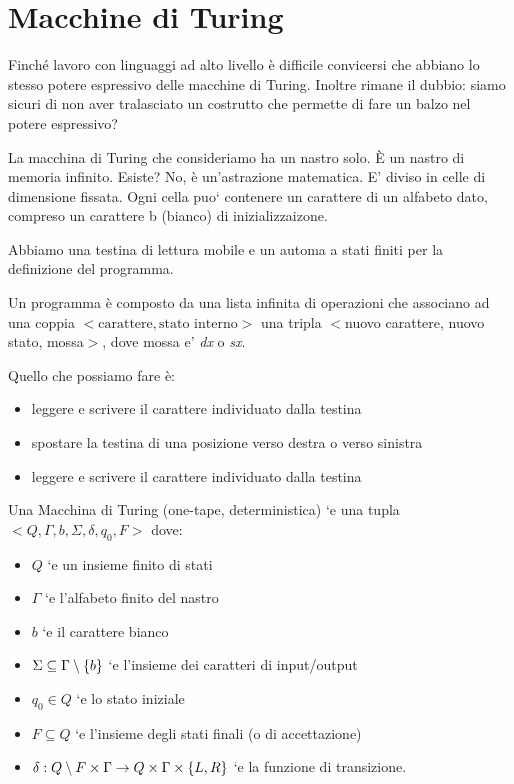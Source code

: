 \section{Macchine di Turing}

Finché lavoro con linguaggi ad alto livello è difficile convicersi che abbiano lo stesso potere
espressivo delle macchine di Turing. Inoltre rimane il dubbio: siamo sicuri di non aver tralasciato
un costrutto che permette di fare un balzo nel potere espressivo?

La macchina di Turing che consideriamo ha un nastro solo. È un nastro di memoria infinito. Esiste?
No, è un'astrazione matematica. E' diviso in celle di dimensione fissata. Ogni cella puo` contenere
un carattere di un alfabeto dato, compreso un carattere b (bianco) di inizializzaizone.

Abbiamo una testina di lettura mobile e un automa a stati finiti per la definizione del programma.

Un programma è composto da una lista infinita di operazioni che associano ad una coppia
$<\text{carattere},\text{stato interno}>$ una tripla $<$nuovo carattere, nuovo stato,
mossa$>$, dove mossa e' \textit{dx} o \textit{sx}.

Quello che possiamo fare è:
\begin{itemize}
    \item leggere e scrivere il carattere individuato dalla testina
    \item spostare la testina di una posizione verso destra o verso sinistra
    \item leggere e scrivere il carattere individuato dalla testina
\end{itemize}

Una Macchina di Turing (one-tape, deterministica) `e una tupla $<Q,\Gamma,b,\Sigma,\delta,q_{0},F>$
dove:
\begin{itemize}
    \item $Q$ `e un insieme finito di stati
    \item $\Gamma$ `e l'alfabeto finito del nastro
    \item $b$ `e il carattere bianco
    \item $\Sigma \subseteq \Gamma \setminus \{b\}$ `e l'insieme dei caratteri di input/output
    \item $q_{0} \in Q$ `e lo stato iniziale
    \item $F \subseteq Q$ `e l'insieme degli stati finali (o di accettazione)
    \item $\delta: Q \setminus F \times \Gamma \to Q \times \Gamma \times \{L,R\}$ `e la funzione di transizione.
\end{itemize}

